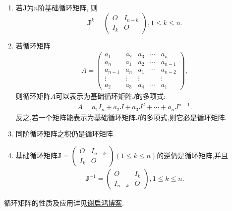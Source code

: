 \documentclass[lang=cn,newtx,10pt,scheme=chinese]{elegantbook}
\begin{document}
\begin{proposition}[循环矩阵的性质]\label{proposition:循环矩阵的性质}
\begin{enumerate}
\item 若$\boldsymbol{J}$为$n$阶基础循环矩阵,
则
\[
\boldsymbol{J}^{k} = 
\begin{pmatrix}
O & I_{n - k} \\
I_{k} & O
\end{pmatrix},  1 \leq k \leq n.
\]
\item 若循环矩阵\begin{align*}
A=\begin{pmatrix}
a_1 & a_2 & a_3 & \cdots & a_n \\
a_n & a_1 & a_2 & \cdots & a_{n - 1} \\
a_{n - 1} & a_n & a_1 & \cdots & a_{n - 2} \\
\vdots & \vdots & \vdots & & \vdots \\
a_2 & a_3 & a_4 & \cdots & a_1
\end{pmatrix},
\end{align*}
则循环矩阵$A$可以表示为基础循环矩阵$J$的多项式:
\begin{align*}
A=a_1I_n+a_2J+a_3J^2+\cdots+a_nJ^{n-1}.
\end{align*}
反之,若一个矩阵能表示为基础循环矩阵$J$的多项式,则它必是循环矩阵.
\item \label{example:iten546641856}同阶循环矩阵之积仍是循环矩阵.
\item 基础循环矩阵$\boldsymbol{J}=
\begin{pmatrix}
O & I_{n - k} \\
I_{k} & O
\end{pmatrix} (1 \leq k \leq n)$的逆仍是循环矩阵,并且
\begin{align*}
\boldsymbol{J}^{-1} =\begin{pmatrix}
O & I_{k} \\
I_{n-k} & O
\end{pmatrix},1 \leq k \leq n.
\end{align*}
\end{enumerate}
\end{proposition}
\begin{note}
循环矩阵的性质及应用详见\href{https://www.cnblogs.com/torsor/p/8848641.html}{谢启鸿博客}.
\end{note}
\end{document}
